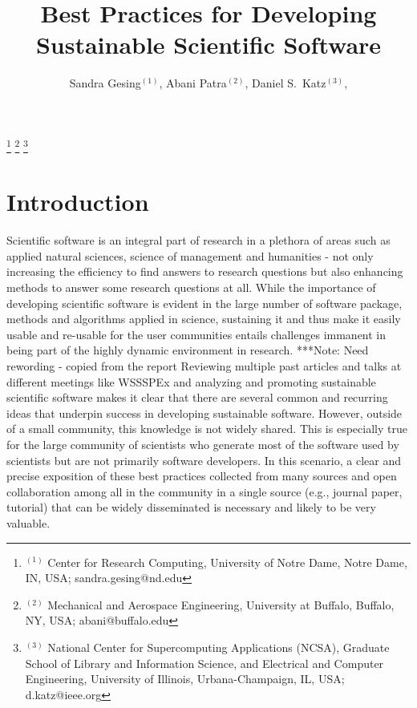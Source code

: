 \documentclass[11pt, oneside]{amsart}
\newcommand{\note}[1]{ {\textcolor{blueish}    { ***Note:      #1 }}}
\begin{document}
\title[]{Best Practices for Developing Sustainable Scientific Software}

\author{Sandra Gesing$^{(1)}$,
Abani Patra$^{(2)}$,
Daniel S.\ Katz$^{(3)}$,
}

%
\thanks{{}$^{(1)}$ Center for Research Computing, University of Notre Dame, Notre Dame, IN, USA; sandra.gesing@nd.edu}
%
\thanks{{}$^{(2)}$ Mechanical and Aerospace Engineering, University at Buffalo, Buffalo, NY, USA; abani@buffalo.edu}
%
\thanks{{}$^{(3)}$ National Center for Supercomputing Applications (NCSA), Graduate School of Library and Information Science, and Electrical and Computer Engineering, University of Illinois, Urbana-Champaign, IL, USA; d.katz@ieee.org}
%
 
\begin{abstract}


\end{abstract}

\maketitle
\newpage

\section{Introduction} \label{sec:intro}

Scientific software is an integral part of research in a plethora of areas such as applied natural sciences, science of management and humanities - not only increasing the efficiency to find answers to research questions but also enhancing methods to answer some research questions at all. While the importance of developing scientific software is evident in the large number of software package, methods and algorithms applied in science, sustaining it and thus make it easily usable and re-usable for the user communities entails challenges immanent in being part of the highly dynamic environment in research. 
\note{Need rewording - copied from the report}
Reviewing multiple past articles and talks at different meetings like WSSSPEx
\cite{WSSSPE1, WSSSPE2, 5069157, Blatt_WSSSPE, Ahern_WSSSPE} and analyzing and
promoting sustainable scientific software makes it clear that there are several
common and recurring ideas that underpin success in developing sustainable
software. However, outside of a small community, this knowledge is not widely
shared. This is especially true for the large community of scientists who
generate most of the software used by scientists but are not primarily software
developers. In this scenario, a clear and precise exposition of these best
practices collected from many sources and open collaboration among all in the
community in a single source (e.g., journal paper, tutorial) that can be widely
disseminated is necessary and likely to be very valuable.
\end{document}
